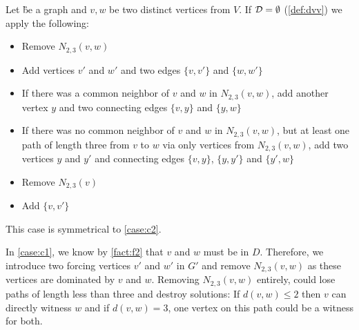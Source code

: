 \begin{rgl}\label{rgl:rtwo}
    Let \G be a graph and $v, w$ be two distinct vertices from $V$. If $\mathbf{\mathcal{D} = \emptyset}$ (\cref{def:dvv}) we apply the following:
    \begin{caseof}

        \vspace{-5mm}
        \begin{itemize}
            \item Remove $N_{2,3}(v,w)$
            \item Add vertices $v'$ and $w'$ and two edges $\{v, v'\}$ and $\{w, w'\}$
            \item If there was a common neighbor of $v$ and $w$ in $N_{2,3}(v,w)$, add another vertex $y$ and two connecting edges  $\{v, y\}$ and $\{y, w\}$
            \item If there was no common neighbor of $v$ and $w$ in $N_{2,3}(v,w)$, but at least one path of length three from $v$ to $w$ via only vertices from $N_{2,3}(v,w)$, add two vertices $y$ and $y'$ and connecting edges $\{v,y\}$, $\{y, y'\}$ and $\{y', w\}$
        \end{itemize}

        \vspace{-5mm}
        \begin{itemize}
            \item Remove $N_{2,3}(v)$
            \item Add $\{v, v'\}$
        \end{itemize}
        
         This case is symmetrical to \cref{case:c2}.
    \end{caseof}
\end{rgl}

In \cref{case:c1}, we know by \cref{fact:f2} that $v$ and $w$ must be in $D$. 
Therefore, we introduce two forcing vertices $v'$ and $w'$ in $G'$ and remove $N_{2,3}(v,w)$ as these vertices are dominated by $v$ and $w$.
Removing $N_{2,3}(v,w)$ entirely, could lose paths of length less than three and destroy solutions: If $d(v,w) \leq 2$ then $v$ can directly witness $w$ and if $d(v,w) = 3$, one vertex on this path could be a witness for both.


